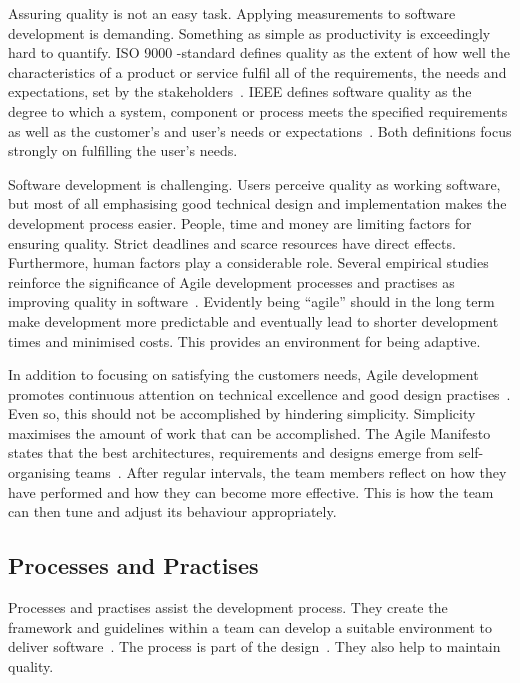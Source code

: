 \documentclass[english]{tktltiki2}
\begin{document}
Assuring quality is not an easy task. Applying measurements to software development is demanding. Something as simple as productivity is exceedingly hard to quantify. ISO 9000 -standard defines quality as the extent of how well the characteristics of a product or service fulfil all of the requirements, the needs and expectations, set by the stakeholders~\cite{ISO9000}. IEEE defines software quality as the degree to which a system, component or process meets the specified requirements as well as the customer’s and user’s needs or expectations~\cite{IEEE1074}. Both definitions focus strongly on fulfilling the user’s needs.

Software development is challenging. Users perceive quality as working software, but most of all emphasising good technical design and implementation makes the development process easier. People, time and money are limiting factors for ensuring quality. Strict deadlines and scarce resources have direct effects. Furthermore, human factors play a considerable role. Several empirical studies reinforce the significance of Agile development processes and practises as improving quality in software~\cite{SS10}. Evidently being “agile” should in the long term make development more predictable and eventually lead to shorter development times and minimised costs. This provides an environment for being adaptive.

In addition to focusing on satisfying the customers needs, Agile development promotes continuous attention on technical excellence and good design practises~\cite{BBB01b}. Even so, this should not be accomplished by hindering simplicity. Simplicity maximises the amount of work that can be accomplished. The Agile Manifesto states that the best architectures, requirements and designs emerge from self-organising teams~\cite{BBB01b}. After regular intervals, the team members reflect on how they have performed and how they can become more effective. This is how the team can then tune and adjust its behaviour appropriately.

\subsection{Processes and Practises}

Processes and practises assist the development process. They create the framework and guidelines within a team can develop a suitable environment to deliver software~\cite{Kni07}. The process is part of the design~\cite{Fow05}. They also help to maintain quality.
\end{document}
